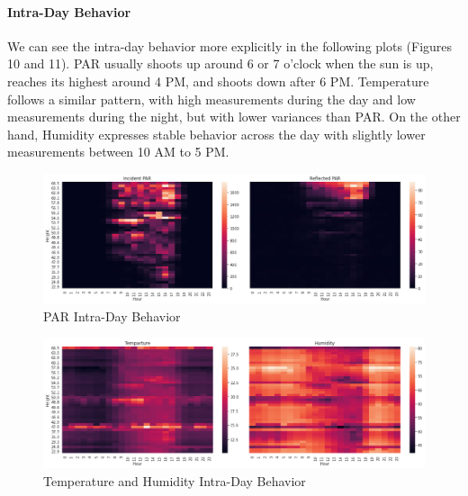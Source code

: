 \documentclass[11pt, letterpaper]{article}
\begin{document}
\paragraph{Intra-Day Behavior}
We can see the intra-day behavior more explicitly in the following plots (Figures 10 and 11). PAR usually shoots up around 6 or 7 o'clock when the sun is up, reaches its highest around 4 PM, and shoots down after 6 PM. Temperature follows a similar pattern, with high measurements during the day and low measurements during the night, but with lower variances than PAR. On the other hand, Humidity expresses stable behavior across the day with slightly lower measurements between 10 AM to 5 PM.
\begin{figure}[h!]
\centering
\includegraphics[width=1\textwidth]{eda_3.2.png}
\captionsetup{justification=centering}
\caption{PAR Intra-Day Behavior}
\end{figure}
\begin{figure}[h!]
\centering
\includegraphics[width=1\textwidth]{eda_3.3.png}
\captionsetup{justification=centering}
\caption{Temperature and Humidity Intra-Day Behavior}
\end{figure}
\end{document}
